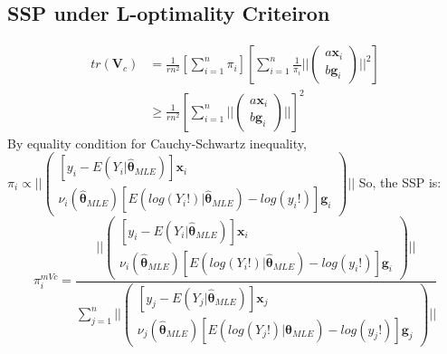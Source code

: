 \documentclass[]{article}
\begin{document}
\subsection{SSP under L-optimality Criteiron}
\begin{align*}
	tr(\boldsymbol{V}_c) &=\frac{1}{rn^2}[\sum_{i=1}^{n}\pi_i][\sum_{i=1}^{n}\frac{1}{\pi_i}||\begin{pmatrix}
		a\boldsymbol{x}_i\\b\boldsymbol{g}_i
	\end{pmatrix}||^2]\\
	&\geq \frac{1}{rn^2}[\sum_{i=1}^{n}||\begin{pmatrix}
		a\boldsymbol{x}_i\\b\boldsymbol{g}_i
	\end{pmatrix}||]^2
\end{align*}
By equality condition for Cauchy-Schwartz inequality, $\pi_i \propto ||\begin{pmatrix}
	[y_i - E(Y_i| \hat{\boldsymbol{\theta}}_{MLE})]\boldsymbol{x}_i\\
	\nu_i(\hat{\boldsymbol{\theta}}_{MLE})[E(log(Y_i!)| \hat{\boldsymbol{\theta}}_{MLE}) - log(y_i!)]\boldsymbol{g}_i
\end{pmatrix}||$
So, the SSP is:
$$
\pi_i^{mVc} = \frac{||\begin{pmatrix}
		[y_i - E(Y_i| \hat{\boldsymbol{\theta}}_{MLE})]\boldsymbol{x}_i\\
		\nu_i(\hat{\boldsymbol{\theta}}_{MLE})[E(log(Y_i!)| \hat{\boldsymbol{\theta}}_{MLE}) - log(y_i!)]\boldsymbol{g}_i
	\end{pmatrix}||}{\sum_{j=1}^{n}||\begin{pmatrix}
		[y_j - E(Y_j| \hat{\boldsymbol{\theta}}_{MLE})]\boldsymbol{x}_j\\
		\nu_j(\hat{\boldsymbol{\theta}}_{MLE})[E(log(Y_j!)| \hat{\boldsymbol{\theta}}_{MLE}) - log(y_j!)]\boldsymbol{g}_j
	\end{pmatrix}||}
$$











	
	
	
	
	
	
\end{document}
